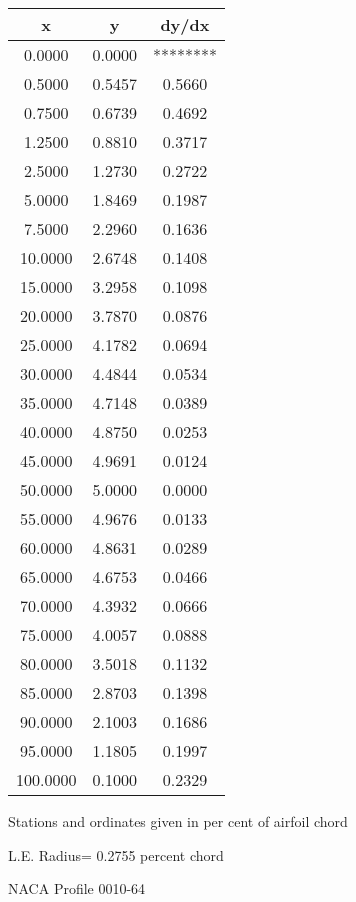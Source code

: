 \documentclass[11pt]{book}
\begin{document}
 \vspace{8mm}
 \begin{tabular}{|c|c|c|} \hline 
  x  &  y  &  dy/dx \\
 \hline
0.0000 & 0.0000 & ******** \\
0.5000 & 0.5457 & 0.5660 \\
0.7500 & 0.6739 & 0.4692 \\
1.2500 & 0.8810 & 0.3717 \\
2.5000 & 1.2730 & 0.2722 \\
5.0000 & 1.8469 & 0.1987 \\
7.5000 & 2.2960 & 0.1636 \\
10.0000 & 2.6748 & 0.1408 \\
15.0000 & 3.2958 & 0.1098 \\
20.0000 & 3.7870 & 0.0876 \\
25.0000 & 4.1782 & 0.0694 \\
30.0000 & 4.4844 & 0.0534 \\
35.0000 & 4.7148 & 0.0389 \\
40.0000 & 4.8750 & 0.0253 \\
45.0000 & 4.9691 & 0.0124 \\
50.0000 & 5.0000 & 0.0000 \\
55.0000 & 4.9676 & 0.0133 \\
60.0000 & 4.8631 & 0.0289 \\
65.0000 & 4.6753 & 0.0466 \\
70.0000 & 4.3932 & 0.0666 \\
75.0000 & 4.0057 & 0.0888 \\
80.0000 & 3.5018 & 0.1132 \\
85.0000 & 2.8703 & 0.1398 \\
90.0000 & 2.1003 & 0.1686 \\
95.0000 & 1.1805 & 0.1997 \\
100.0000 & 0.1000 & 0.2329 \\
 \hline
 \end{tabular}
 \vspace{8mm}


Stations and ordinates given in per cent of airfoil chord 


L.E. Radius=  0.2755 percent chord
 \newpage
  \label{p0010-64}
 \begin{Large}
 NACA Profile 0010-64
 \end{Large}
  
\end{document}
